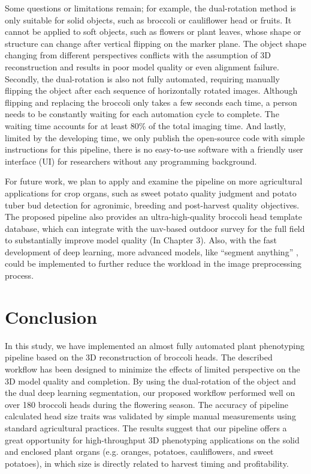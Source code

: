 Some questions or limitations remain; for example, the dual-rotation method is only suitable for solid objects, such as broccoli or cauliflower head or fruits. It cannot be applied to soft objects, such as flowers or plant leaves, whose shape or structure can change after vertical flipping on the marker plane. The object shape changing from different perspectives conflicts with the assumption of 3D reconstruction and results in poor model quality or even alignment failure. Secondly, the dual-rotation is also not fully automated, requiring manually flipping the object after each sequence of horizontally rotated images. Although flipping and replacing the broccoli only takes a few seconds each time, a person needs to be constantly waiting for each automation cycle to complete. The waiting time accounts for at least 80\% of the total imaging time. And lastly, limited by the developing time, we only publish the open-source code with simple instructions for this pipeline, there is no easy-to-use software with a friendly user interface (UI) for researchers without any programming background.

For future work, we plan to apply and examine the pipeline on more agricultural applications for crop organs, such as sweet potato quality judgment and potato tuber bud detection for agronimic, breeding and post-harvest quality objectives. The proposed pipeline also provides an ultra-high-quality broccoli head template database, which can integrate with the \gls{uav}-based outdoor survey for the full field to substantially improve model quality (In Chapter 3). Also, with the fast development of deep learning, more advanced models, like ``segment anything'' \citep{kirillov_segany_2023}, could be implemented to further reduce the workload in the image preprocessing process.

\section{Conclusion}

In this study, we have implemented an almost fully automated plant phenotyping pipeline based on the 3D reconstruction of broccoli heads. The described workflow has been designed to minimize the effects of limited perspective on the 3D model quality and completion. By using the dual-rotation of the object and the dual deep learning segmentation, our proposed workflow performed well on over 180 broccoli heads during the flowering season. The accuracy of pipeline calculated head size traits was validated by simple manual measurements using standard agricultural practices. The results suggest that our pipeline offers a great opportunity for high-throughput 3D phenotyping applications on the solid and enclosed plant organs (e.g. oranges, potatoes, cauliflowers, and sweet potatoes), in which size is directly related to harvest timing and profitability.
